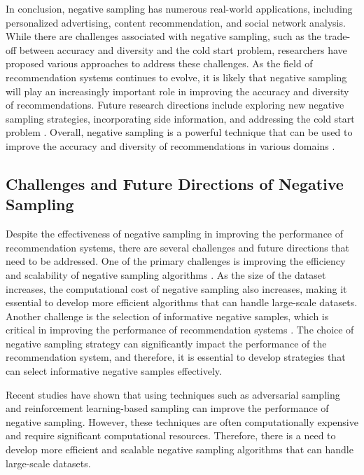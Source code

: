 \documentclass[11pt,a4paper]{article}
\begin{document}
In conclusion, negative sampling has numerous real-world applications, including personalized advertising, content recommendation, and social network analysis. While there are challenges associated with negative sampling, such as the trade-off between accuracy and diversity and the cold start problem, researchers have proposed various approaches to address these challenges. As the field of recommendation systems continues to evolve, it is likely that negative sampling will play an increasingly important role in improving the accuracy and diversity of recommendations. Future research directions include exploring new negative sampling strategies, incorporating side information, and addressing the cold start problem \cite{doi:10.1145/3340631.3394858}. Overall, negative sampling is a powerful technique that can be used to improve the accuracy and diversity of recommendations in various domains \cite{doi:10.1016/j.neucom.2018.01.057}.


\subsection{Challenges and Future Directions of Negative Sampling}


Despite the effectiveness of negative sampling in improving the performance of recommendation systems, there are several challenges and future directions that need to be addressed. One of the primary challenges is improving the efficiency and scalability of negative sampling algorithms \cite{doi:10.1145/3331184.3331337}. As the size of the dataset increases, the computational cost of negative sampling also increases, making it essential to develop more efficient algorithms that can handle large-scale datasets. Another challenge is the selection of informative negative samples, which is critical in improving the performance of recommendation systems \cite{doi:10.1145/3394486.3403226}. The choice of negative sampling strategy can significantly impact the performance of the recommendation system, and therefore, it is essential to develop strategies that can select informative negative samples effectively.

Recent studies have shown that using techniques such as adversarial sampling and reinforcement learning-based sampling can improve the performance of negative sampling. However, these techniques are often computationally expensive and require significant computational resources. Therefore, there is a need to develop more efficient and scalable negative sampling algorithms that can handle large-scale datasets. 
\end{document}
